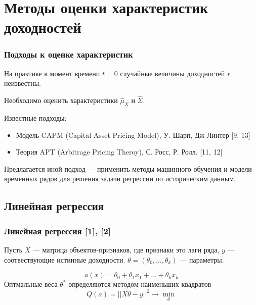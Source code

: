 \documentclass{beamer}
\begin{document}



\section{Методы оценки характеристик доходностей}

\begin{frame}
    \frametitle{Подходы к оценке характеристик}

    На практике в момент времени $t=0$ случайные величины доходностей $r$ неизвестны.
    
    Необходимо оценить характеристики $\hat{\mu}_X$ и $\hat{\Sigma}$.

    Известные подходы:
    \begin{itemize}
        \item Модель CAPM (Capital Asset Pricing Model), У. Шарп, Дж Линтер [9, 13]
        \item Теория  APT (Arbitrage Pricing Theroy), С. Росс, Р. Ролл. [11, 12]
    \end{itemize}
    
    Предлагается иной подход --- применить методы машинного обучения и модели временных
    рядов для решения задачи регрессии по историческим данным.
\end{frame}

\subsection{Линейная регрессия}

\begin{frame}
    \frametitle{Линейная регрессия [1], [2]}
    Пусть $X$ --- матрица объектов-признаков, где признаки это лаги ряда,
    $y$ --- соотвествующие истинные доходности.
    $\theta = (\theta_0, \dots, \theta_k)$ --- параметры.
    
    \[
        a(x) = \theta_0 + \theta_1 x_1 + \dots + \theta_k x_k
    \]
    Оптмальные веса $\theta^*$ определяются методом наименьших квадратов
    \[
        Q(a) = || X\theta - y||^2 \rightarrow \min_{\theta}
    \]
\end{frame}
\end{document}
